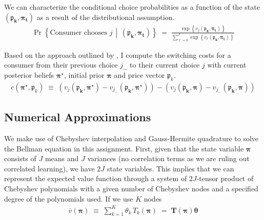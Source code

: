 \documentclass[11pt]{article}
\begin{document}
\noindent We can characterize the conditional choice probabilities as a function of the state $(\mathbf{\boldsymbol{\mathfrak{p}}_k, \boldsymbol{\pi}_t})$ as a result of the distributional assumption.
\begin{gather}
    \Pr \left\{\text{Consumer chooses } j \, \middle| \, (\mathbf{\boldsymbol{\mathfrak{p}}_k, \boldsymbol{\pi}_t}) \right\} \; = \; \frac{\exp \left\{ v_j(\mathbf{\boldsymbol{\mathfrak{p}}_k, \boldsymbol{\pi}_t})  \right\}}{\displaystyle \sum_{\ell = 0}^J \exp \left\{ v_\ell(\mathbf{\boldsymbol{\mathfrak{p}}_k, \boldsymbol{\pi}_t})  \right\}} \label{eq:CCP}
\end{gather}

\noindent Based on the approach outlined by \citet{hartmann-viard-2008}, I compute the switching costs for a consumer from their previous choice $j_{-}$ to their current choice $j$ with current posterior beliefs $\boldsymbol{\pi}^\star$, initial prior $\boldsymbol{\pi}$ and price vector $\boldsymbol{\mathfrak{p}}_k$.
\begin{gather}
    c(\boldsymbol{\pi}^\star, \boldsymbol{\mathfrak{p}}_k) \; \equiv \; \left(v_j(\mathbf{\boldsymbol{\mathfrak{p}}_k, \boldsymbol{\pi}^\star}) - v_{j_-}(\mathbf{\boldsymbol{\mathfrak{p}}_k, \boldsymbol{\pi}^\star })\right) - \left(v_j(\mathbf{\boldsymbol{\mathfrak{p}}_k, \boldsymbol{\pi}}) - v_{j_-}(\mathbf{\boldsymbol{\mathfrak{p}}_k, \boldsymbol{\pi}})\right) \label{eq:cost}
\end{gather}

\subsection*{Numerical Approximations}
We make use of Chebyshev interpolation and Gauss-Hermite quadrature to solve the Bellman equation in this assignment. First, given that the state variable $\boldsymbol{\pi}$ consists of $J$ means and $J$ variances (no correlation terms as we are ruling out correlated learning), we have $2J$ state variables. This implies that we can represent the expected value function through a system of $2J$-tensor product of Chebyshev polynomials with a given number of Chebyshev nodes and a specified degree of the polynomials used. If we use $K$ nodes
\begin{gather*}
    \overline{v}(\boldsymbol{\pi}) \; \equiv \; \sum_{k = 1}^K \theta_k \, {T}_k(\boldsymbol{\pi}) \; = \; \boldsymbol{T}(\boldsymbol{\pi}) \boldsymbol{\theta}
\end{gather*}
\end{document}
